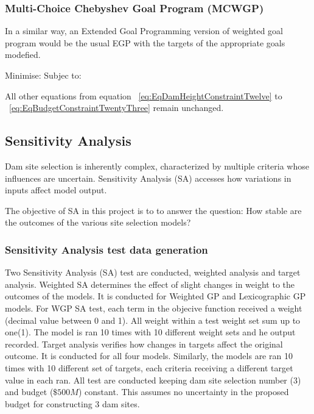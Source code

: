 \subsubsection{Multi-Choice Chebyshev Goal Program (MCWGP)}
In a similar way, an Extended Goal Programming version of weighted goal program would be the usual EGP with the targets of the appropriate goals modefied.

Minimise:
              \EqEGPObjectiveThirtyThree
Subjec to:
              \EqMCWGPPopulationConstraintFourtyTwo   
              \EqMCWGPResidenceConstraintFourtyThree
              \EqMCWGPFarmlandDistanceConstraintFourtyFour
              \EqMCWGPNearestRoadConstraintFourtyFive
              \EqMCWGPFarmlandAreaConstraintFourtySix
              \begin{center}
                      All other equations from equation ~\eqref{eq:EqDamHeightConstraintTwelve} to ~\eqref{eq:EqBudgetConstraintTwentyThree} remain unchanged. 
              \end{center}
              \EqSelectThreeDamsTwentyTwo
              \EqBudgetConstraintTwentyThree
              \EqDConstraintOneNTwentyFour
              \EqDConstraintTwoNTwentyFive
              \EqDConstraintThreeNTwentySix
              \EqDConstraintFourNTwentySix
              \EqDConstraintFiveNTwentySeven
              \EqDConstraintSixNTwentyEight
              \EqDConstraintSevenNTwentyNine
              \EqDConstraintEightNThirty
              \EqDConstraintNineNThirtyOne
              \EqDConstraintTenNThirtyTwo

\subsection{Sensitivity Analysis}
Dam site selection is inherently complex, characterized by multiple criteria whose influences are uncertain. Sensitivity Analysis (SA) accesses how variations in inputs affect model output\cite{Jakub2023}.

The objective of SA in this project is to to answer the question: How stable are the outcomes of the various site selection models?

\subsubsection{Sensitivity Analysis test data generation}
Two Sensitivity Analysis (SA) test are conducted, weighted analysis and target analysis. Weighted SA determines the effect of slight changes in weight to the outcomes of the models. It is conducted for Weighted GP and Lexicographic GP models. For WGP SA test, each term in the objecive function received a weight (decimal value between 0 and 1). All weight within a test weight set sum up to one(1). The model is ran 10 times with 10 different weight sets and he output recorded. Target analysis verifies how changes in targets affect the original outcome. It is conducted for all four models. Similarly, the models are ran 10 times with 10 different set of targets, each criteria receiving a different target value in each ran. All test are conducted keeping dam site selection number (3) and budget ($\$500M$) constant. This assumes no uncertainty in the proposed budget for constructing 3 dam sites.

